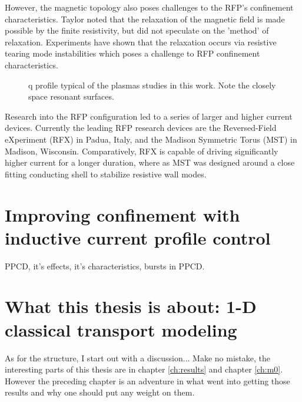 \begin{refsection}
However, the magnetic topology also poses challenges to the RFP's confinement characteristics. Taylor noted that the relaxation of the magnetic field is made possible by the finite resistivity, but did not speculate on the 'method' of
relaxation. Experiments have shown that the relaxation occurs via resistive tearing mode instabilities which poses a challenge to RFP confinement characteristics.

\begin{figure}
	\centering
    \label{fig:q_profile}
    
    \caption[Example RPF q profile]{q profile typical of the plasmas studies in this work. Note the closely space resonant surfaces.}

\end{figure}

Research into the RFP configuration led to a series of larger and higher current devices. Currently the leading RFP research devices are the Reversed-Field eXperiment\cite{Bartiromo1999RecentExperiment} (RFX) in Padua, Italy, and the Madison Symmetric Torus\cite{Dexter1991} (MST) in Madison, Wisconsin. Comparatively, RFX is capable of driving significantly higher current for a longer duration, where as MST was designed around a close fitting conducting shell to stabilize resistive wall modes.


\section{Improving confinement with inductive current profile control}

PPCD, it's effects, it's characteristics, bursts in PPCD.

\section{What this thesis is about: 1-D classical transport modeling}


As for the structure, I start out with a discussion...
Make no mistake, the interesting parts of this thesis are in chapter \ref{ch:results} and chapter \ref{ch:m0}. However the preceding chapter is an adventure in what went into getting those results and why one should put any weight on them.





\end{refsection}